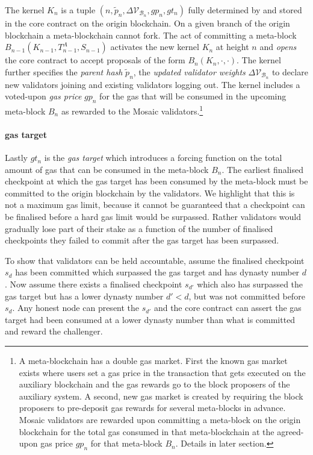 \documentclass[12pt,a4paper]{article}
\begin{document}
The kernel $K_n$ is a tuple $(n, \tilde{p}_n, \Delta\mathcal{V}_{\mathcal{B}_n}, gp_n, gt_n)$ fully determined by and stored in the core contract on the origin blockchain. %
On a given branch of the origin blockchain a meta-blockchain cannot fork.
The act of committing a meta-block $B_{n-1}(K_{n-1}, T^A_{n-1}, S_{n-1})$ activates the new kernel $K_n$ at height $n$ and \emph{opens} the core contract to accept proposals of the form $B_n(K_n, \cdot, \cdot)$.
The kernel further specifies the \emph{parent hash} $\tilde{p}_n$, the \emph{updated validator weights} $\Delta\mathcal{V}_{\mathcal{B}_n}$ to declare new validators joining and existing validators logging out. The kernel includes a voted-upon \emph{gas price} $gp_n$ for the gas that will be consumed in the upcoming meta-block $B_n$ as rewarded to the Mosaic validators.\footnote{
  A meta-blockchain has a double gas market.
  First the known gas market exists where users set a gas price in the transaction that gets executed on the auxiliary blockchain and the gas rewards go to the block proposers of the auxiliary system.
  A second, new gas market is created by requiring the block proposers to pre-deposit gas rewards for several meta-blocks in advance.
  Mosaic validators are rewarded upon committing a meta-block on the origin blockchain for the total gas consumed in that meta-blockchain at the agreed-upon gas price $gp_n$ for that meta-block $B_n$.
  Details in later section.
}

\paragraph{gas target} Lastly $gt_n$ is the \emph{gas target} which introduces a forcing function on the total amount of gas that can be consumed in the meta-block $B_n$.
The earliest finalised checkpoint at which the gas target has been consumed by the meta-block must be committed to the origin blockchain by the validators.
We highlight that this is not a maximum gas limit, because it cannot be guaranteed that a checkpoint can be finalised before a hard gas limit would be surpassed. Rather validators would gradually lose part of their stake as a function of the number of finalised checkpoints they failed to commit after the gas target has been surpassed.

To show that validators can be held accountable, assume the finalised checkpoint $s_d$ has been committed which surpassed the gas target and has dynasty number $d$.
Now assume there exists a finalised checkpoint $s_{d'}$ which also has surpassed the gas target but has a lower dynasty number $d' < d$, but was not committed before $s_d$.
Any honest node can present the $s_{d'}$ and the core contract can assert the gas target had been consumed at a lower dynasty number than what is committed and reward the challenger.
\end{document}
